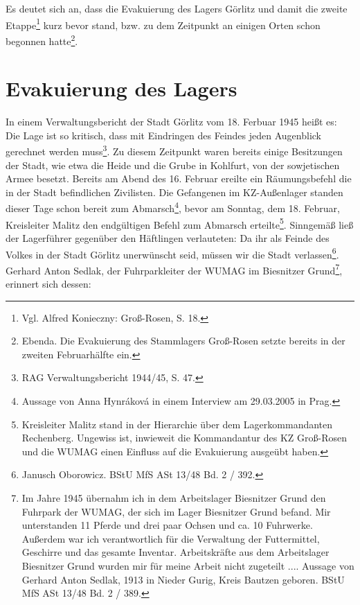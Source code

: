 \newline
Es deutet sich an, dass die Evakuierung des Lagers Görlitz und damit die zweite Etappe\footnote{Vgl. Alfred Konieczny: Groß-Rosen, S. 18.} kurz bevor stand, bzw. zu dem Zeitpunkt an einigen Orten schon begonnen hatte\footnote{Ebenda. Die Evakuierung des Stammlagers Groß-Rosen setzte bereits in der zweiten Februarhälfte ein.}.

\section{Evakuierung des Lagers}

In einem Verwaltungsbericht der Stadt Görlitz vom 18. Ferbuar 1945 heißt es: \glqq Die Lage ist so kritisch, dass mit Eindringen des Feindes jeden Augenblick gerechnet werden muss\grqq\footnote{RAG Verwaltungsbericht 1944/45, S. 47.}. Zu diesem Zeitpunkt waren bereits einige Besitzungen der Stadt, wie etwa die Heide und die Grube in Kohlfurt, von der sowjetischen Armee besetzt. Bereits am Abend des 16. Februar ereilte ein Räumungsbefehl die in der Stadt befindlichen Zivilisten. Die Gefangenen im KZ-Außenlager standen dieser Tage schon bereit zum Abmarsch\footnote{Aussage von Anna Hynráková in einem Interview am 29.03.2005 in Prag.}, bevor am Sonntag, dem 18. Februar, Kreisleiter Malitz den endgültigen Befehl zum Abmarsch erteilte\footnote{Kreisleiter Malitz stand in der Hierarchie über dem Lagerkommandanten Rechenberg. Ungewiss ist, inwieweit die Kommandantur des KZ Groß-Rosen und die WUMAG einen Einfluss auf die Evakuierung ausgeübt haben.}. Sinngemäß ließ der Lagerführer gegenüber den Häftlingen verlauteten: \glqq Da ihr als Feinde des Volkes in der Stadt Görlitz unerwünscht seid, müssen wir die Stadt verlassen\grqq\footnote{Janusch Oborowicz. BStU MfS ASt 13/48 Bd. 2 / 392.}. Gerhard Anton Sedlak, der Fuhrparkleiter der WUMAG im Biesnitzer Grund\footnote{\glqq Im Jahre 1945 übernahm ich in dem Arbeitslager Biesnitzer Grund den Fuhrpark der WUMAG, der sich im Lager Biesnitzer Grund befand. Mir unterstanden 11 Pferde und drei paar Ochsen und ca. 10 Fuhrwerke. Außerdem war ich verantwortlich für die Verwaltung der Futtermittel, Geschirre und das gesamte Inventar. Arbeitskräfte aus dem Arbeitslager Biesnitzer Grund wurden mir für meine Arbeit nicht zugeteilt ...\grqq. Aussage von Gerhard Anton Sedlak, 1913 in Nieder Gurig, Kreis Bautzen geboren. BStU MfS ASt 13/48 Bd. 2 / 389.}, erinnert sich dessen:

